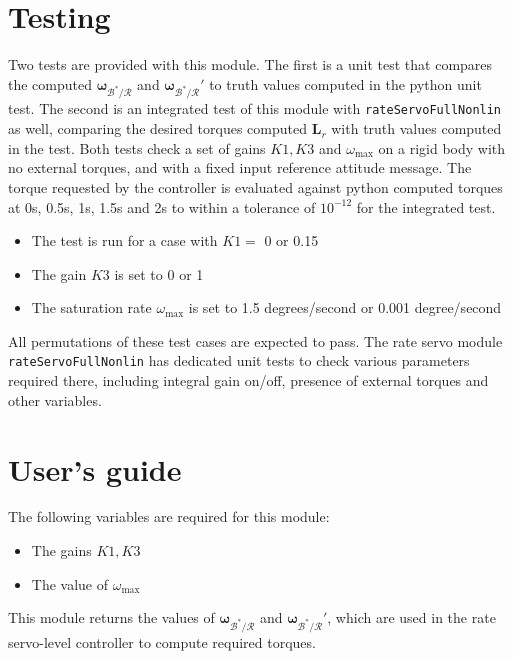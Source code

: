 \documentclass[]{BasiliskReportMemo}
\begin{document}
\section{Testing}
Two tests are provided with this module. The first is a unit test that compares the computed $\bm\omega_{\mathcal{B}^{\ast}/\mathcal{R}} $ and $\bm\omega_{\mathcal{B}^{\ast}/\mathcal{R}}' $ to truth values computed in the python unit test. The second is an integrated test of this module with \verb|rateServoFullNonlin| as well, comparing the desired torques computed $\bm L_r$ with truth values computed in the test. 
Both tests check a set of gains $K1,K3$ and $\omega_{\text{max}}$ on a rigid body with no external torques, and with a fixed input reference attitude message. The torque requested by the controller is evaluated against python computed torques at 0s, 0.5s, 1s, 1.5s and 2s to within a tolerance of $10^{-12}$ for the integrated test. 
\begin{itemize}
	\item The test is run for a case with $K1 =$ 0 or 0.15
	\item The gain $K3$ is set to 0 or 1
	\item The saturation rate $\omega_\text{max}$ is set to 1.5 degrees/second or 0.001 degree/second
\end{itemize}
All permutations of these test cases are expected to pass.
The rate servo module  \verb|rateServoFullNonlin| has dedicated unit tests to check various parameters required there, including integral gain on/off, presence of external torques and other variables.

\section{User's guide}
The following variables are required for this module:
\begin{itemize}
\item The gains $K1, K3$
\item The value of $\omega_\text{max}$
\end{itemize}
This module returns the values of $\bm\omega_{\mathcal{B}^{\ast}/\mathcal{R}} $ and $\bm\omega_{\mathcal{B}^{\ast}/\mathcal{R}}' $, which are used in the rate servo-level controller to compute required torques.

\end{document}
